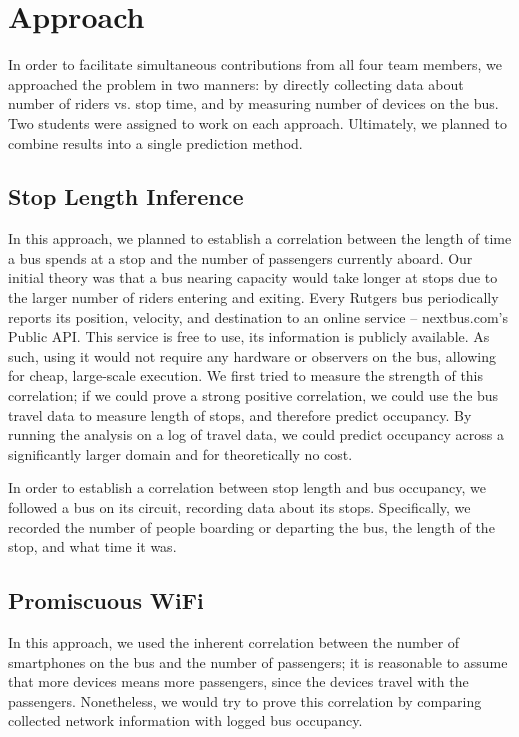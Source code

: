 \section{Approach}

In order to facilitate simultaneous contributions from all four team members, we approached the problem in two manners: by directly collecting data about number of riders vs. stop time, and by measuring number of devices on the bus.
Two students were assigned to work on each approach.
Ultimately, we planned to combine results into a single prediction method.

\subsection{Stop Length Inference}

In this approach, we planned to establish a correlation between the length of time a bus spends at a stop and the number of passengers currently aboard.
Our initial theory was that a bus nearing capacity would take longer at stops due to the larger number of riders entering and exiting.
Every Rutgers bus periodically reports its position, velocity, and destination to an online service -- nextbus.com's Public API.
This service is free to use, its information is publicly available. %
As such, using it would not require any hardware or observers on the bus, allowing for cheap, large-scale execution.
We first tried to measure the strength of this correlation; if we could prove a strong positive correlation, we could use the bus travel data to measure length of stops, and therefore predict occupancy.
By running the analysis on a log of travel data, we could predict occupancy across a significantly larger domain and for theoretically no cost.

In order to establish a correlation between stop length and bus occupancy, we followed a bus on its circuit, recording data about its stops. Specifically, we recorded the number of people boarding or departing the bus, the length of the stop, and what time it was.

\subsection{Promiscuous WiFi}


In this approach, we used the inherent correlation between the number of smartphones on the bus and the number of passengers; it is reasonable to assume that more devices means more passengers, since the devices travel with the passengers.
Nonetheless, we would try to prove this correlation by comparing collected network information with logged bus occupancy.

